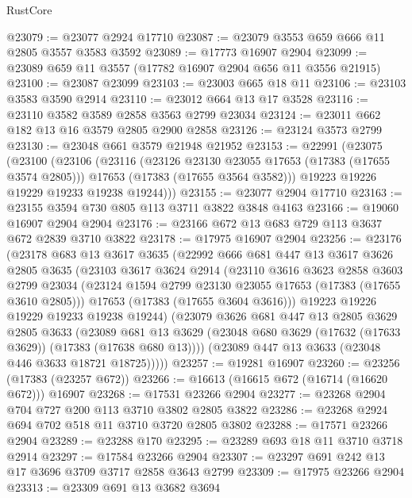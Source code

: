 \begin{lexlean}{RustCore}
\begin{coremodule}
@23079 := @23077 @2924 @17710
@23087 := @23079 @3553 @659 @666 @11 @2805 @3557 @3583 @3592
@23089 := @17773 @16907 @2904
@23099 := @23089 @659 @11 @3557 (@17782 @16907 @2904 @656 @11 @3556 @21915)
@23100 := @23087 @23099
@23103 := @23003 @665 @18 @11
@23106 := @23103 @3583 @3590 @2914
@23110 := @23012 @664 @13 @17 @3528
@23116 := @23110 @3582 @3589 @2858 @3563 @2799 @23034
@23124 := @23011 @662 @182 @13 @16 @3579 @2805 @2900 @2858
@23126 := @23124 @3573 @2799
@23130 := @23048 @661 @3579 @21948 @21952
@23153 := @22991
    (@23075
      (@23100
        (@23106
          (@23116
            (@23126 @23130 @23055 @17653 (@17383 (@17655 @3574 @2805)))
            @17653
            (@17383 (@17655 @3564 @3582)))
          @19223
          @19226
          @19229
          @19233
          @19238
          @19244)))
@23155 := @23077 @2904 @17710
@23163 := @23155 @3594 @730 @805 @113 @3711 @3822 @3848 @4163
@23166 := @19060 @16907 @2904 @2904
@23176 := @23166 @672 @13 @683 @729 @113 @3637 @672 @2839 @3710 @3822
@23178 := @17975 @16907 @2904
@23256 := @23176
    (@23178
      @683
      @13
      @3617
      @3635
      (@22992
        @666
        @681
        @447
        @13
        @3617
        @3626
        @2805
        @3635
        (@23103
          @3617
          @3624
          @2914
          (@23110
            @3616
            @3623
            @2858
            @3603
            @2799
            @23034
            (@23124 @1594 @2799 @23130 @23055 @17653 (@17383 (@17655 @3610 @2805)))
            @17653
            (@17383 (@17655 @3604 @3616)))
          @19223
          @19226
          @19229
          @19233
          @19238
          @19244)
        (@23079
          @3626
          @681
          @447
          @13
          @2805
          @3629
          @2805
          @3633
          (@23089
            @681
            @13
            @3629
            (@23048 @680 @3629 (@17632 (@17633 @3629)) (@17383 (@17638 @680 @13))))
          (@23089 @447 @13 @3633 (@23048 @446 @3633 @18721 @18725)))))
@23257 := @19281 @16907
@23260 := @23256 (@17383 (@23257 @672))
@23266 := @16613 (@16615 @672 (@16714 (@16620 @672))) @16907
@23268 := @17531 @23266 @2904
@23277 := @23268 @2904 @704 @727 @200 @113 @3710 @3802 @2805 @3822
@23286 := @23268 @2924 @694 @702 @518 @11 @3710 @3720 @2805 @3802
@23288 := @17571 @23266 @2904
@23289 := @23288 @170
@23295 := @23289 @693 @18 @11 @3710 @3718 @2914
@23297 := @17584 @23266 @2904
@23307 := @23297 @691 @242 @13 @17 @3696 @3709 @3717 @2858 @3643 @2799
@23309 := @17975 @23266 @2904
@23313 := @23309 @691 @13 @3682 @3694

\end{coremodule}
\end{lexlean}
